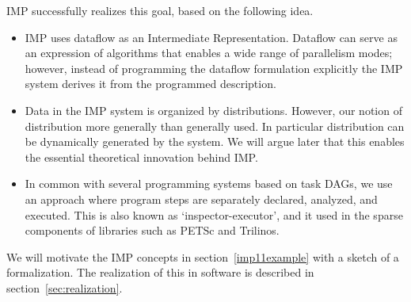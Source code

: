 \ac{IMP} successfully realizes this goal, based on the following idea.
\begin{itemize}
\item IMP uses dataflow as an Intermediate Representation. Dataflow 
  can serve as an expression of algorithms that enables a wide range
  of parallelism modes; however, instead of programming the dataflow
  formulation explicitly the IMP system derives it from the programmed
  description.
\item Data in the IMP system is organized by distributions. However,
  our notion of distribution more generally than generally used. In
  particular distribution can be dynamically generated by the
  system. We will argue later that this enables the essential
  theoretical innovation behind IMP.
\item In common with several programming systems based on task
  \acp{DAG}, we use an approach where program steps are separately
  declared, analyzed, and executed. This is also known as
  `inspector-executor', and it used in the sparse components of
  libraries such as PETSc and Trilinos.
\end{itemize}
We will motivate the IMP concepts in section~\ref{imp11example} with a
sketch of a formalization. The realization of this in software is
described in section~\ref{sec:realization}.
